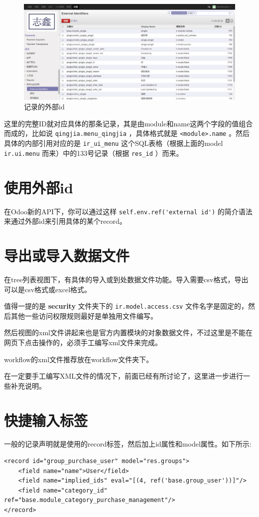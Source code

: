\documentclass[11pt,a4paper]{sphinxmanual}
\begin{document}
\begin{figure}[H]
\centering
\includegraphics[keepaspectratio,max width=0.95\linewidth]{images/记录的外部id.png}
\caption{记录的外部id}
\end{figure}

这里的完整ID就对应具体的那条记录，其是由module和name这两个字段的值组合而成的，比如说 \verb~qingjia.menu_qingjia~ ，具体格式就是 \verb~<module>.name~ 。然后具体的内部引用对应的是 \verb~ir_ui_menu~ 这个SQL表格（根据上面的model \verb~ir.ui.menu~ 而来）中的133号记录（根据 \verb~res_id~ ）而来。


\section{使用外部id}
\label{sec-9-2}
在Odoo新的API下，你可以通过这样 \verb~self.env.ref('external id')~ 的简介语法来通过外部id来引用具体的某个record。


\section{导出或导入数据文件}
\label{sec-9-3}
在tree列表视图下，有具体的导入或到处数据文件功能。导入需要csv格式，导出可以是csv格式或excel格式。

值得一提的是 \textbf{security} 文件夹下的 \verb~ir.model.access.csv~ 文件名字是固定的，然后其他一些访问权限规则最好是单独用文件编写。

然后视图的xml文件讲起来也是官方内置模块的对象数据文件，不过这里是不能在网页下点击操作的，必须手工编写xml文件来完成。

workflow的xml文件推荐放在workflow文件夹下。


在一定要手工编写XML文件的情况下，前面已经有所讨论了，这里进一步进行一些补充说明。



\section{快捷输入标签}
\label{sec-9-4}
一般的记录声明就是使用的record标签，然后加上id属性和model属性。如下所示:
\begin{Verbatim}
<record id="group_purchase_user" model="res.groups">
    <field name="name">User</field>
    <field name="implied_ids" eval="[(4, ref('base.group_user'))]"/>
    <field name="category_id" ref="base.module_category_purchase_management"/>
</record>
\end{Verbatim}
\end{document}
